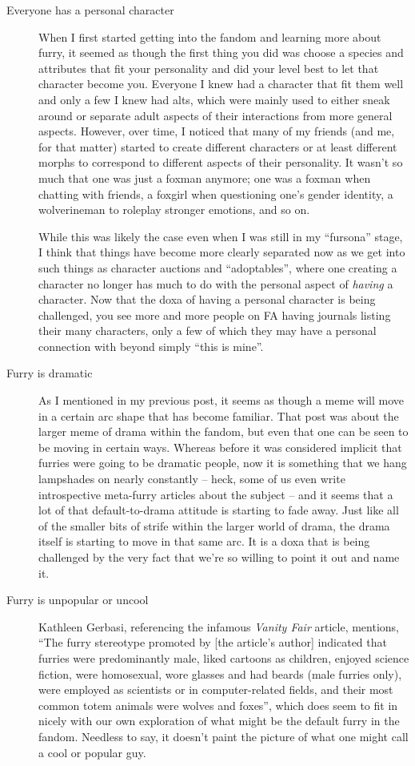\begin{description}
  \item[Everyone has a personal character] When I first started getting into the fandom and learning more about furry, it seemed as though the first thing you did was choose a species and attributes that fit your personality and did your level best to let that character become you.  Everyone I knew had a character that fit them well and only a few I knew had alts, which were mainly used to either sneak around or separate adult aspects of their interactions from more general aspects.  However, over time, I noticed that many of my friends (and me, for that matter) started to create different characters or at least different morphs to correspond to different aspects of their personality.  It wasn’t so much that one was just a foxman anymore; one was a foxman when chatting with friends, a foxgirl when questioning one’s gender identity, a wolverineman to roleplay stronger emotions, and so on.

  While this was likely the case even when I was still in my ``fursona'' stage, I think that things have become more clearly separated now as we get into such things as character auctions and ``adoptables'', where one creating a character no longer has much to do with the personal aspect of \textit{having} a character.  Now that the doxa of having a personal character is being challenged, you see more and more people on FA having journals listing their many characters, only a few of which they may have a personal connection with beyond simply ``this is mine''.

  \item[Furry is dramatic] As I mentioned in my previous post, it seems as though a meme will move in a certain arc shape that has become familiar.  That post was about the larger meme of drama within the fandom, but even that one can be seen to be moving in certain ways.  Whereas before it was considered implicit that furries were going to be dramatic people, now it is something that we hang lampshades on nearly constantly -- heck, some of us even write introspective meta-furry articles about the subject -- and it seems that a lot of that default-to-drama attitude is starting to fade away.  Just like all of the smaller bits of strife within the larger world of drama, the drama itself is starting to move in that same arc.  It is a doxa that is being challenged by the very fact that we’re so willing to point it out and name it.

  \item[Furry is unpopular or uncool] Kathleen Gerbasi, referencing the infamous \textit{Vanity Fair} article, mentions, ``The furry stereotype promoted by [the article’s author] indicated that furries were predominantly male, liked cartoons as children, enjoyed science fiction, were homosexual, wore glasses and had beards (male furries only), were employed as scientists or in computer-related fields, and their most common totem animals were wolves and foxes'', which does seem to fit in nicely with our own exploration of what might be the default furry in the fandom.  Needless to say, it doesn’t paint the picture of what one might call a cool or popular guy.


\end{description}
